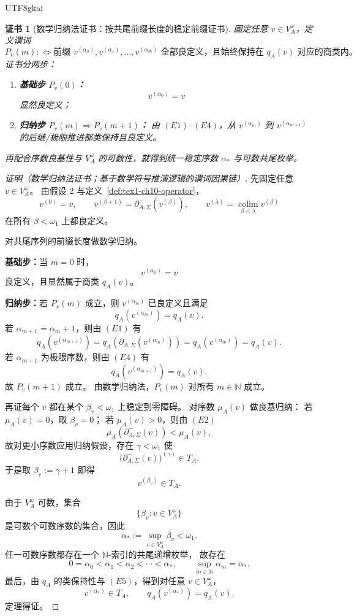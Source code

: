 \documentclass[12pt]{article}
\newtheorem{Certificate}{证书}[section]
\newcommand{\NN}{\mathbb{N}}
\begin{document}
\begin{CJK*}{UTF8}{gkai}
\begin{Certificate}[数学归纳法证书：按共尾前缀长度的稳定前缀证书]
\label{cert:tex1-ch10-axiom-downgraded}
固定任意 \(v\in V_A^\omega\)，定义谓词
\[
  P_v(m)
  :
  \Longleftrightarrow
  \text{前缀 }
  v^{(\alpha_0)},v^{(\alpha_1)},\dots,v^{(\alpha_m)}
  \text{ 全部良定义，且始终保持在 }q_A(v)\text{ 对应的商类内。}
\]
证书分两步：
\begin{enumerate}
  \item \textbf{基础步 \(P_v(0)\)：}
  \[
    v^{(\alpha_0)}=v
  \]
  显然良定义；
  \item \textbf{归纳步 \(P_v(m)\Rightarrow P_v(m+1)\)：}
  由 \((E1)\)--\((E4)\)，从 \(v^{(\alpha_m)}\) 到 \(v^{(\alpha_{m+1})}\) 的后继/极限推进都类保持且良定义。
\end{enumerate}
再配合序数良基性与 \(V_A^\omega\) 的可数性，就得到统一稳定序数 \(\alpha_\ast\) 与可数共尾枚举。
\end{Certificate}

\begin{proof}[证明（数学归纳法证书；基于数学符号推演逻辑的谓词因果链）]
先固定任意 \(v\in V_A^\omega\)。
由假设 2 与定义~\ref{def:tex1-ch10-operator}，
\[
  v^{(0)}=v,\qquad
  v^{(\beta+1)}=\partial^-_{A,\Sigma}(v^{(\beta)}),\qquad
  v^{(\lambda)}=\operatorname*{colim}_{\beta<\lambda}v^{(\beta)}
\]
在所有 \(\beta<\omega_1\) 上都良定义。

对共尾序列的前缀长度做数学归纳。

\textbf{基础步：}当 \(m=0\) 时，
\[
  v^{(\alpha_0)}=v
\]
良定义，且显然属于商类 \(q_A(v)\)。

\textbf{归纳步：}若 \(P_v(m)\) 成立，则 \(v^{(\alpha_m)}\) 已良定义且满足
\[
  q_A(v^{(\alpha_m)})=q_A(v).
\]
若 \(\alpha_{m+1}=\alpha_m+1\)，则由 \((E1)\) 有
\[
  q_A(v^{(\alpha_{m+1})})
  =
  q_A(\partial^-_{A,\Sigma}(v^{(\alpha_m)}))
  =
  q_A(v^{(\alpha_m)})
  =
  q_A(v).
\]
若 \(\alpha_{m+1}\) 为极限序数，则由 \((E4)\) 有
\[
  q_A(v^{(\alpha_{m+1})})=q_A(v).
\]
故 \(P_v(m+1)\) 成立。
由数学归纳法，\(P_v(m)\) 对所有 \(m\in\NN\) 成立。

再证每个 \(v\) 都在某个 \(\beta_v<\omega_1\) 上稳定到零障碍。
对序数 \(\mu_A(v)\) 做良基归纳：
若 \(\mu_A(v)=0\)，取 \(\beta_v=0\)；
若 \(\mu_A(v)>0\)，则由 \((E2)\)
\[
  \mu_A(\partial^-_{A,\Sigma}(v))<\mu_A(v),
\]
故对更小序数应用归纳假设，存在 \(\gamma<\omega_1\) 使
\[
  \bigl(\partial^-_{A,\Sigma}(v)\bigr)^{(\gamma)}\in T_A.
\]
于是取 \(\beta_v:=\gamma+1\) 即得
\[
  v^{(\beta_v)}\in T_A.
\]

由于 \(V_A^\omega\) 可数，集合
\[
  \{\beta_v:v\in V_A^\omega\}
\]
是可数个可数序数的集合，因此
\[
  \alpha_\ast:=\sup_{v\in V_A^\omega}\beta_v<\omega_1.
\]
任一可数序数都存在一个 \(\NN\)-索引的共尾递增枚举，
故存在
\[
  0=\alpha_0<\alpha_1<\alpha_2<\cdots<\alpha_\ast,
  \qquad
  \sup_{m\in\NN}\alpha_m=\alpha_\ast.
\]
最后，由 \(q_A\) 的类保持性与 \((E5)\)，得到对任意 \(v\in V_A^\omega\)，
\[
  v^{(\alpha_\ast)}\in T_A,
  \qquad
  q_A(v^{(\alpha_\ast)})=q_A(v).
\]
定理得证。
\end{proof}


\end{CJK*}
\end{document}
